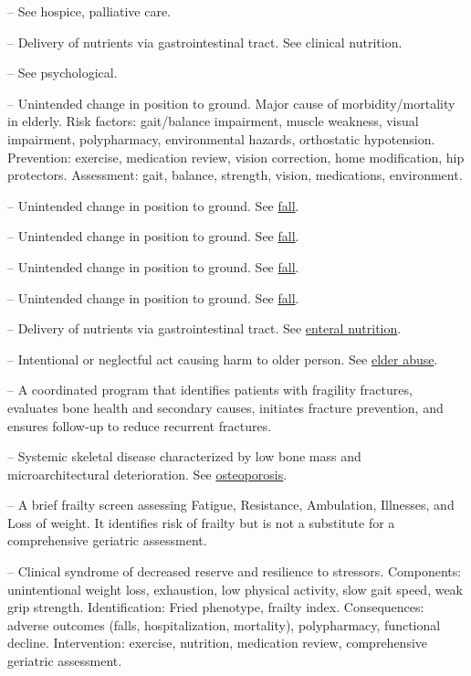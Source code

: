 -- See hospice, palliative care.

-- Delivery of nutrients via gastrointestinal tract. See clinical nutrition.

-- See psychological.

-- Unintended change in position to ground. Major cause of morbidity/mortality in elderly. Risk factors: gait/balance impairment, muscle weakness, visual impairment, polypharmacy, environmental hazards, orthostatic hypotension. Prevention: exercise, medication review, vision correction, home modification, hip protectors. Assessment: gait, balance, strength, vision, medications, environment.

-- Unintended change in position to ground. See \hyperlink{Fall}{fall}.

-- Unintended change in position to ground. See \hyperlink{Fall}{fall}.

-- Unintended change in position to ground. See \hyperlink{Fall}{fall}.

-- Unintended change in position to ground. See \hyperlink{Fall}{fall}.

-- Delivery of nutrients via gastrointestinal tract. See \hyperlink{Enteral Nutrition}{enteral nutrition}.

-- Intentional or neglectful act causing harm to older person. See \hyperlink{Elder Abuse}{elder abuse}.

-- A coordinated program that identifies patients with fragility fractures, evaluates bone health and secondary causes, initiates fracture prevention, and ensures follow-up to reduce recurrent fractures.

-- Systemic skeletal disease characterized by low bone mass and microarchitectural deterioration. See \hyperlink{Osteoporosis}{osteoporosis}.


-- A brief frailty screen assessing Fatigue, Resistance, Ambulation, Illnesses, and Loss of weight. It identifies risk of frailty but is not a substitute for a comprehensive geriatric assessment.

-- Clinical syndrome of decreased reserve and resilience to stressors. Components: unintentional weight loss, exhaustion, low physical activity, slow gait speed, weak grip strength. Identification: Fried phenotype, frailty index. Consequences: adverse outcomes (falls, hospitalization, mortality), polypharmacy, functional decline. Intervention: exercise, nutrition, medication review, comprehensive geriatric assessment.

